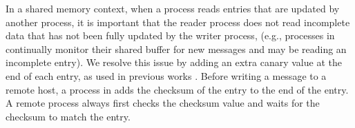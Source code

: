 In a shared memory context, when a process reads entries that are
updated by another process, it is important that the reader process does not
read incomplete data that has not been fully updated by the writer process,
(e.g., processes in \libname continually monitor their shared buffer for new
messages and may be reading an incomplete entry). We resolve this issue by
adding an extra canary value at the end of each entry, as used in previous works 
\cite{APUS,FaRM,kalia2014using, islam2012high, Mu}. 
Before writing a message to a remote host, a process in \libname adds the checksum of the
entry to the end of the entry. A remote process always first checks
the checksum value and waits for the checksum to match the entry.


%
%
